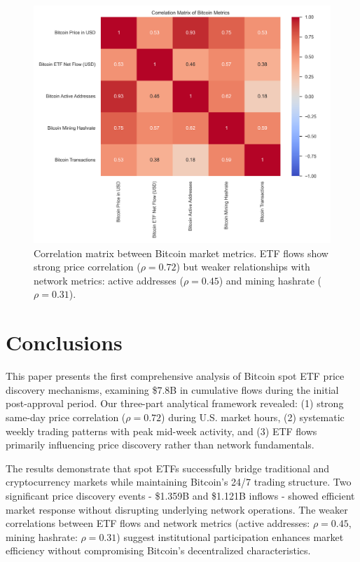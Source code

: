 \documentclass{article} %
\begin{document}
\begin{figure}[h]
    \centering
    \includegraphics[width=\textwidth]{correlation_matrix.png}
    \caption{Correlation matrix between Bitcoin market metrics. ETF flows show strong price correlation ($\rho = 0.72$) but weaker relationships with network metrics: active addresses ($\rho = 0.45$) and mining hashrate ($\rho = 0.31$).}
    \label{fig:correlation}
\end{figure}

\section{Conclusions}
\label{sec:conclusion}

This paper presents the first comprehensive analysis of Bitcoin spot ETF price discovery mechanisms, examining \$7.8B in cumulative flows during the initial post-approval period. Our three-part analytical framework revealed: (1) strong same-day price correlation ($\rho = 0.72$) during U.S. market hours, (2) systematic weekly trading patterns with peak mid-week activity, and (3) ETF flows primarily influencing price discovery rather than network fundamentals.

The results demonstrate that spot ETFs successfully bridge traditional and cryptocurrency markets while maintaining Bitcoin's 24/7 trading structure. Two significant price discovery events - \$1.359B and \$1.121B inflows - showed efficient market response without disrupting underlying network operations. The weaker correlations between ETF flows and network metrics (active addresses: $\rho = 0.45$, mining hashrate: $\rho = 0.31$) suggest institutional participation enhances market efficiency without compromising Bitcoin's decentralized characteristics.
\end{document}
